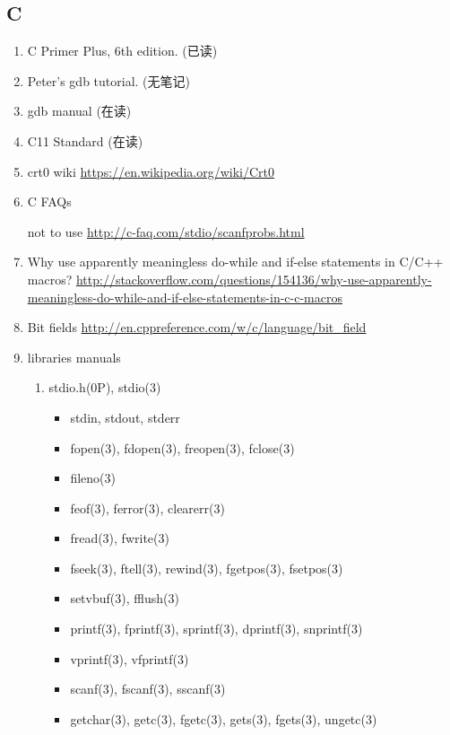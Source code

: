 \documentclass{article}
\begin{document}
\subsection{C}
\begin{enumerate}
    \item C Primer Plus, 6th edition. (已读)
    \item Peter's gdb tutorial. (无笔记)
    \item gdb manual (在读)
    \item C11 Standard (在读)
    \item crt0 wiki \url{https://en.wikipedia.org/wiki/Crt0}
    \item C FAQs
        \begin{itemize}
            not to use  \url{http://c-faq.com/stdio/scanfprobs.html}
        \end{itemize}
    \item Why use apparently meaningless do-while and if-else statements in C/C++ macros?
        \url{http://stackoverflow.com/questions/154136/why-use-apparently-meaningless-do-while-and-if-else-statements-in-c-c-macros}
    \item Bit fields \url{http://en.cppreference.com/w/c/language/bit_field}
    \item libraries manuals
        \begin{enumerate}
            \item stdio.h(0P), stdio(3)
                \begin{itemize}
                    \item stdin, stdout, stderr
                    \item fopen(3), fdopen(3), freopen(3), fclose(3)
                    \item fileno(3)
                    \item feof(3), ferror(3), clearerr(3)
                    \item fread(3), fwrite(3)
                    \item fseek(3), ftell(3), rewind(3), fgetpos(3), fsetpos(3)
                    \item setvbuf(3), fflush(3)
                    \item printf(3), fprintf(3), sprintf(3), dprintf(3), snprintf(3)
                    \item vprintf(3), vfprintf(3)
                    \item scanf(3), fscanf(3), sscanf(3)
                    \item getchar(3), getc(3), fgetc(3), gets(3), fgets(3), ungetc(3)

\end{itemize}
\end{enumerate}
\end{enumerate}
\end{document}
